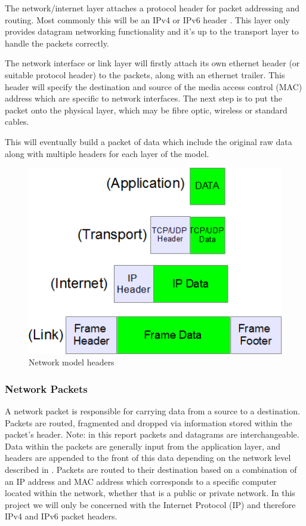 \documentclass[final_report.tex]{subfiles}
\begin{document}
The network/internet layer attaches a protocol header for packet addressing and routing. Most commonly this will be an IPv4 or IPv6 header . This layer only provides datagram networking functionality and it's up to the transport layer to handle the packets correctly.

The network interface or link layer will firstly attach its own ethernet header (or suitable protocol header) to the packets, along with an ethernet trailer. This header will specify the destination and source of the media access control (MAC) address which are specific to network interfaces. The next step is to put the packet onto the physical layer, which may be fibre optic, wireless or standard cables.

This will eventually build a packet of data which include the original raw data along with multiple headers for each layer of the model. 

\begin{figure}[H]
	\centering
	\includegraphics[width=\textwidth]{img/headers.png}
	\caption{Network model headers}
	\label{fig:headers}
\end{figure}

\subsubsection{Network Packets}
A network packet is responsible for carrying data from a source to a destination. Packets are routed, fragmented and dropped via information stored within the packet's header. Note: in this report packets and datagrams are interchangeable. Data within the packets are generally input from the application layer, and headers are appended to the front of this data depending on the network level described in . Packets are routed to their destination based on a combination of an IP address and MAC address which corresponds to a specific computer located within the network, whether that is a public or private network. In this project we will only be concerned with the Internet Protocol (IP) and therefore IPv4 and IPv6 packet headers.  
\end{document}
